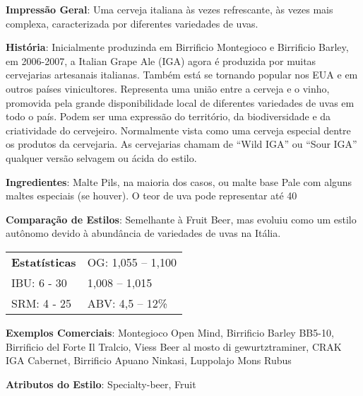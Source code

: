 \textbf{Impressão Geral}: Uma cerveja italiana às vezes refrescante, às vezes mais complexa, caracterizada por diferentes variedades de uvas.

\textbf{História}: Inicialmente produzinda em Birrificio Montegioco e Birrificio Barley, em 2006-2007, a Italian Grape Ale (IGA) agora é produzida por muitas cervejarias artesanais italianas. Também está se tornando popular nos EUA e em outros países vinicultores. Representa uma união entre a cerveja e o vinho, promovida pela grande disponibilidade local de diferentes variedades de uvas em todo o país. Podem ser uma expressão do território, da biodiversidade e da criatividade do cervejeiro. Normalmente vista como uma cerveja especial dentre os produtos da cervejaria. As cervejarias chamam de “Wild IGA” ou “Sour IGA” qualquer versão selvagem ou ácida do estilo.

\textbf{Ingredientes}: Malte Pils, na maioria dos casos, ou malte base Pale com alguns maltes especiais (se houver). O teor de uva pode representar até 40%

\textbf{Comparação de Estilos}: Semelhante à Fruit Beer, mas evoluiu como um estilo autônomo devido à abundância de variedades de uvas na Itália.

\begin{tabular}{@{}p{35mm}p{35mm}@{}}
  \textbf{Estatísticas} & OG: 1,055 – 1,100 \\
  IBU: 6 - 30 & 1,008 – 1,015 \\
  SRM: 4 - 25 & ABV: 4,5 – 12\%
\end{tabular}

\textbf{Exemplos Comerciais}: Montegioco Open Mind, Birrificio Barley BB5-10, Birrificio del Forte Il Tralcio, Viess Beer al mosto di gewurtztraminer, CRAK IGA Cabernet, Birrificio Apuano Ninkasi, Luppolajo Mons Rubus

\textbf{Atributos do Estilo}: Specialty-beer, Fruit
